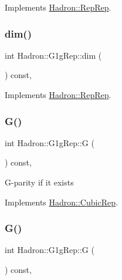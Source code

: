 Implements \mbox{\hyperlink{structHadron_1_1RepRep_a92c8802e5ed7afd7da43ccfd5b7cd92b}{Hadron\+::\+Rep\+Rep}}.

\mbox{\label{structHadron_1_1G1gRep_aa6f93ed967ef889de7a9f5aaad48a69b}} 
\subsubsection{\texorpdfstring{dim()}{dim()}\hspace{0.1cm}{\footnotesize\ttfamily [3/3]}}
{\footnotesize\ttfamily int Hadron\+::\+G1g\+Rep\+::dim (\begin{DoxyParamCaption}{ }\end{DoxyParamCaption}) const\hspace{0.3cm}{\ttfamily [inline]}, {\ttfamily [virtual]}}



Implements \mbox{\hyperlink{structHadron_1_1RepRep_a92c8802e5ed7afd7da43ccfd5b7cd92b}{Hadron\+::\+Rep\+Rep}}.

\mbox{\label{structHadron_1_1G1gRep_aa9607b9bc9fbe4949b3b20273e93add9}} 
\subsubsection{\texorpdfstring{G()}{G()}\hspace{0.1cm}{\footnotesize\ttfamily [1/2]}}
{\footnotesize\ttfamily int Hadron\+::\+G1g\+Rep\+::G (\begin{DoxyParamCaption}{ }\end{DoxyParamCaption}) const\hspace{0.3cm}{\ttfamily [inline]}, {\ttfamily [virtual]}}

G-\/parity if it exists 

Implements \mbox{\hyperlink{structHadron_1_1CubicRep_a52104e43266d1614c00bbd1c3b395458}{Hadron\+::\+Cubic\+Rep}}.

\mbox{\label{structHadron_1_1G1gRep_aa9607b9bc9fbe4949b3b20273e93add9}} 
\subsubsection{\texorpdfstring{G()}{G()}\hspace{0.1cm}{\footnotesize\ttfamily [2/2]}}
{\footnotesize\ttfamily int Hadron\+::\+G1g\+Rep\+::G (\begin{DoxyParamCaption}{ }\end{DoxyParamCaption}) const\hspace{0.3cm}{\ttfamily [inline]}, {\ttfamily [virtual]}}

